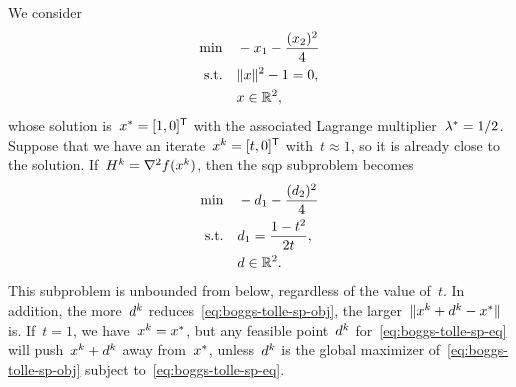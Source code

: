 We consider
\begin{align*}
    \min        & \quad -\iter_1 - \frac{(\iter_2)^2}{4}\\
    \text{s.t.} & \quad \norm{\iter}^2 - 1 = 0,\\
                & \quad \iter \in \R^2,
\end{align*}
whose solution is~$\iter[\ast] = [1, 0]^{\T}$ with the associated Lagrange multiplier~$\lm[\ast] = 1/2$.
Suppose that we have an iterate~$\iter[k] = [t, 0]^{\T}$ with~$t \approx 1$, so it is already close to the solution.
If~$H^k = \nabla^2 \obj(\iter[k])$, then the \gls{sqp} subproblem becomes
\begin{subequations}
    \begin{align}
        \min        & \quad -\step_1 - \frac{(\step_2)^2}{4} \label{eq:boggs-tolle-sp-obj}\\
        \text{s.t.} & \quad \step_1 = \frac{1 - t^2}{2 t}, \label{eq:boggs-tolle-sp-eq}\\
                    & \quad \step \in \R^2. \nonumber
    \end{align}
\end{subequations}
This subproblem is unbounded from below, regardless of the value of~$t$.
In addition, the more~$\step[k]$ reduces~\cref{eq:boggs-tolle-sp-obj}, the larger~$\norm{\iter[k] + \step[k] - \iter[\ast]}$ is.
If~$t = 1$, we have~$\iter[k] = \iter[\ast]$, but any feasible point~$\step[k]$ for~\cref{eq:boggs-tolle-sp-eq} will push~$\iter[k] + \step[k]$ away from~$\iter[\ast]$, unless~$\step[k]$ is the global maximizer of~\cref{eq:boggs-tolle-sp-obj} subject to~\cref{eq:boggs-tolle-sp-eq}.

